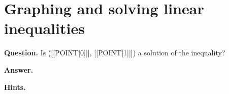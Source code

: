 \documentclass{article}
\begin{document}
\section*{Graphing and solving linear inequalities}
\textbf{Question.} Is ([[POINT[0]]], [[POINT[1]]]) a solution of the inequality?

\textbf{Answer.} 

\textbf{Hints.}
\begin{itemize}

\end{itemize}
\end{document}
